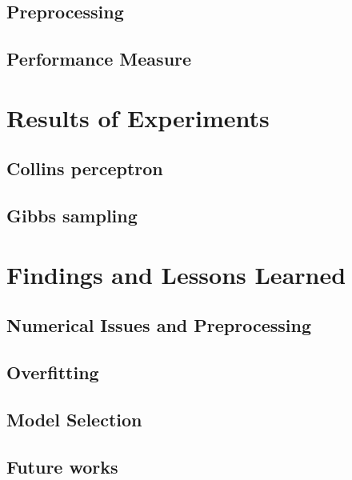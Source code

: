 \documentclass[twoside,12pt]{article}
\begin{document}
\subsection{Preprocessing}
\subsection{Performance Measure}
\section{Results of Experiments}
\subsection{Collins perceptron}
\subsection{Gibbs sampling}

\section{Findings and Lessons Learned}
\subsection{Numerical Issues and Preprocessing}
\subsection{Overfitting}
\subsection{Model Selection}
\subsection{Future works}
\end{document}
